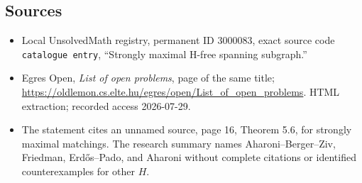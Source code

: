\documentclass[11pt]{article}
\begin{document}
\subsection{Sources}
\begin{itemize}
\item Local UnsolvedMath registry, permanent ID \(3000083\), exact source code \texttt{catalogue entry}, ``Strongly maximal H-free spanning subgraph.''
\item Egres Open, \emph{List of open problems}, page of the same title; \url{https://oldlemon.cs.elte.hu/egres/open/List_of_open_problems}. HTML extraction; recorded access 2026-07-29.
\item The statement cites an unnamed source, page 16, Theorem 5.6, for strongly maximal matchings. The research summary names Aharoni--Berger--Ziv, Friedman, Erd\H{o}s--Pado, and Aharoni without complete citations or identified counterexamples for other \(H\).
\end{itemize}
\end{document}
